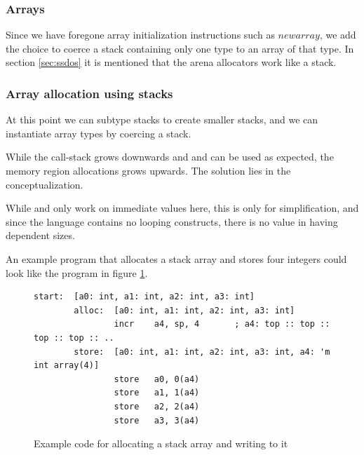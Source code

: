 \subsubsection{Arrays}
Since we have foregone array initialization instructions such as $newarray$, we
add the choice to coerce a stack containing only one type to an array of that
type.
In section \ref{sec:ssdos} it is mentioned that the arena allocators work like
a stack.

\subsubsection{Array allocation using stacks}
At this point we can subtype stacks to create smaller stacks, and we can
instantiate array types by coercing a stack.


While the call-stack grows downwards and \incr and \decr can be used as
expected, the memory region allocations grows upwards.
The solution lies in the conceptualization.

While \incr and \decr only work on immediate values here, this is only for
simplification, and since the language contains no looping constructs, there is
no value in having dependent sizes.

An example program that allocates a stack array and stores four integers could
look like the program in figure \ref{code:ex-prog}.
\begin{figure}
    \begin{lstlisting}[gobble=8]
        start:  [a0: int, a1: int, a2: int, a3: int]
        alloc:  [a0: int, a1: int, a2: int, a3: int]
                incr    a4, sp, 4       ; a4: top :: top :: top :: top :: ..
        store:  [a0: int, a1: int, a2: int, a3: int, a4: 'm int array(4)]
                store   a0, 0(a4)
                store   a1, 1(a4)
                store   a2, 2(a4)
                store   a3, 3(a4)
    \end{lstlisting}
    \caption{Example code for allocating a stack array and writing to it}
    \label{code:ex-prog}
\end{figure}

